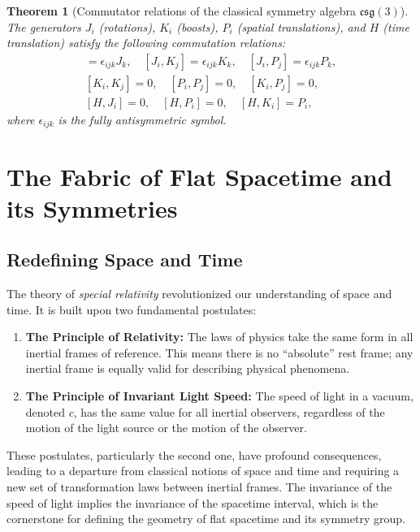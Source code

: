 \documentclass{amsart}
\newtheorem{theorem}{Theorem}[section]
\theoremstyle{definition}
\theoremstyle{remark}
\begin{document}
\begin{theorem}[Commutator relations of the classical symmetry algebra $\mathfrak{csg}(3)$]\label{thm:csg3_commutation_relations}
  The generators \(J_i\) (rotations), \(K_i\) (boosts), \(P_i\) (spatial translations), and \(H\) (time translation) satisfy the following commutation relations:
  \begin{gather*}
    [J_i, J_j] = \epsilon_{ijk} J_k, \quad
    [J_i, K_j] = \epsilon_{ijk} K_k, \quad
    [J_i, P_j] = \epsilon_{ijk} P_k, \\
    [K_i, K_j] = 0, \quad
    [P_i, P_j] = 0, \quad
    [K_i, P_j] = 0, \\
    [H, J_i] = 0, \quad
    [H, P_i] = 0, \quad
    [H, K_i] = P_i,
  \end{gather*}
  where $\epsilon_{ijk}$ is the fully antisymmetric symbol.
\end{theorem}

\section{The Fabric of Flat Spacetime and its Symmetries}
\label{sec:sr}

\subsection{Redefining Space and Time}
\label{subsec:sr_postulates}
The theory of \emph{special relativity} revolutionized our understanding of space and time. It is built upon two fundamental postulates:

\begin{enumerate}
  \item \textbf{The Principle of Relativity:} The laws of physics take the same form in all inertial frames of reference. This means there is no ``absolute'' rest frame; any inertial frame is equally valid for describing physical phenomena.
  \item \textbf{The Principle of Invariant Light Speed:} The speed of light in a vacuum, denoted $c$, has the same value for all inertial observers, regardless of the motion of the light source or the motion of the observer.
\end{enumerate}
These postulates, particularly the second one, have profound consequences, leading to a departure from classical notions of space and time and requiring a new set of transformation laws between inertial frames. The invariance of the speed of light implies the invariance of the spacetime interval, which is the cornerstone for defining the geometry of flat spacetime and its symmetry group.
\end{document}
